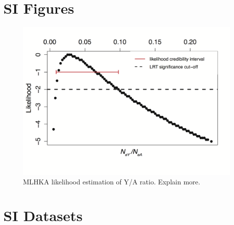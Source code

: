 \documentclass[9pt,onecolumn,twoside]{pnas-new}
\begin{document}
\section*{SI Figures}

\begin{figure}[tbhp!]
\centering
\includegraphics[width=.5\linewidth]{mlhka_figureS1.png}
\caption{MLHKA likelihood estimation of Y/A ratio. Explain more.}
\label{figure:mlhka_figureS1}
\end{figure}

\section*{SI Datasets}
\end{document}
